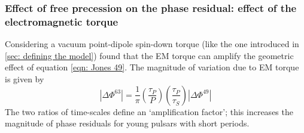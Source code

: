

\begin{figure}[htb]
\begin{floatrow}
\capbtabbox{%
  
}{%
  \caption{}%
  \label{tab: 49 verification properties}
}
\end{floatrow}
\end{figure}

\FloatBarrier
\subsubsection{Effect of free precession on the phase residual: effect of the 
            electromagnetic torque}
Considering a vacuum point-dipole spin-down torque (like the one introduced in 
\ref{sec: defining the model}) \citet{Jones2001} found that the EM torque can
amplify the geometric effect of equation \eqref{eqn: Jones 49}. The magnitude
of variation due to EM torque is given by 
\begin{equation}
    |\Delta\Phi^{63}| = \frac{1}{\pi}\left(\frac{\tau_{P}}{P}\right)
    \left(\frac{\tau_{P}}{\tau_{S}}\right) 
                                    |\Delta\Phi^{49}|
\label{eqn: Jones 63}
\end{equation}
The two ratios of time-scales define an `amplification factor'; this increases
the magnitude of phase residuals for young pulsars with short periods.


